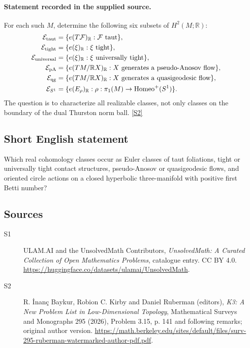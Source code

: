 \documentclass[11pt]{article}
\newcommand{\sref}[2]{\hyperlink{source:#1:#2}{[S#2]}}
\begin{document}
\paragraph{Statement recorded in the supplied source.}
For each such $M$, determine the following six subsets of $H^2(M;\mathbb R)$:
\[
\begin{aligned}
\mathcal E_{\rm taut}&=\{e(T\mathcal F)_{\mathbb R}:\mathcal F\text{ taut}\},\\
\mathcal E_{\rm tight}&=\{e(\xi)_{\mathbb R}:\xi\text{ tight}\},\\
\mathcal E_{\rm universal}&=\{e(\xi)_{\mathbb R}:\xi\text{ universally tight}\},\\
\mathcal E_{\rm pA}&=\{e(TM/\mathbb RX)_{\mathbb R}:X\text{ generates a pseudo-Anosov flow}\},\\
\mathcal E_{\rm qg}&=\{e(TM/\mathbb RX)_{\mathbb R}:X\text{ generates a quasigeodesic flow}\},\\
\mathcal E_{S^1}&=\{e(E_\rho)_{\mathbb R}:\rho:\pi_1(M)\to\operatorname{Homeo}^+(S^1)\}.
\end{aligned}
\]
The question is to characterize all realizable classes, not only classes on the boundary of the dual Thurston norm ball. \sref{statement}{2}
\subsection{Short English statement}
Which real cohomology classes occur as Euler classes of taut foliations, tight or universally tight contact structures, pseudo-Anosov or quasigeodesic flows, and oriented circle actions on a closed hyperbolic three-manifold with positive first Betti number?
\subsection{Sources}
\begin{description}
\item[\hypertarget{source:statement:1}{S1}] ULAM.AI and the UnsolvedMath Contributors, \emph{UnsolvedMath: A Curated Collection of Open Mathematics Problems}, catalogue entry. CC BY 4.0. \url{https://huggingface.co/datasets/ulamai/UnsolvedMath}.
\item[\hypertarget{source:statement:2}{S2}] R. İnanç Baykur, Robion C. Kirby and Daniel Ruberman (editors), \emph{K3: A New Problem List in Low-Dimensional Topology}, Mathematical Surveys and Monographs 295 (2026), Problem 3.15, p. 141 and following remarks; original author version. \url{https://math.berkeley.edu/sites/default/files/surv-295-ruberman-watermarked-author-pdf.pdf}.
\end{description}
\label{end:statement}
\end{document}
